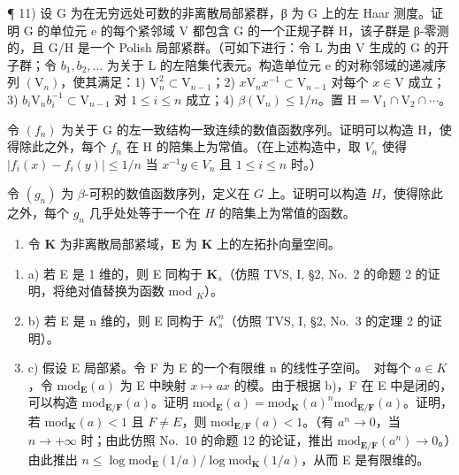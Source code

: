 ¶ 11) 设 G 为在无穷远处可数的非离散局部紧群，β 为 G 上的左 Haar 测度。证明 G 的单位元 e 的每个紧邻域 V 都包含 G 的一个正规子群 H，该子群是 β-零测的，且 G/H 是一个 Polish 局部紧群。（可如下进行：令 L 为由 V 生成的 G 的开子群；令 \(b_{1}, b_{2}, \ldots\) 为关于 L 的左陪集代表元。构造单位元 e 的对称邻域的递减序列 \((\mathrm{V}_{n})\)，使其满足：1) \(\mathrm{V}_{n}^{2} \subset \mathrm{V}_{n-1}\)；2) \(x\mathrm{V}_{n}x^{-1} \subset \mathrm{V}_{n-1}\) 对每个 \(x \in \mathrm{V}\) 成立；3) \(b_{i}\mathrm{V}_{n}b_{i}^{-1} \subset \mathrm{V}_{n-1}\) 对 \(1 \leqslant i \leqslant n\) 成立；4) \(\beta(\mathrm{V}_{n}) \leqslant 1/n\)。置 \(\mathrm{H} = \mathrm{V}_{1} \cap \mathrm{V}_{2} \cap \cdots\)。

令 \((f_{n})\) 为关于 G 的左一致结构一致连续的数值函数序列。证明可以构造 H，使得除此之外，每个 \(f_{n}\) 在 H 的陪集上为常值。（在上述构造中，取 \(V_{n}\) 使得 \(|f_{i}(x) - f_{i}(y)| \leqslant 1/n\) 当 \(x^{-1}y \in V_{n}\) 且 \(1 \leqslant i \leqslant n\) 时。）

令 \((g_n)\) 为 \(\beta\)-可积的数值函数序列，定义在 \(G\) 上。证明可以构造 \(H\)，使得除此之外，每个 \(g_n\) 几乎处处等于一个在 \(H\) 的陪集上为常值的函数。

\begin{enumerate}
\def\labelenumi{\arabic{enumi})}
\setcounter{enumi}{11}
\tightlist
\item
  令 \(\mathbf{K}\) 为非离散局部紧域，\(\mathbf{E}\) 为 \(\mathbf{K}\) 上的左拓扑向量空间。
\end{enumerate}

\begin{enumerate}
\def\labelenumi{\alph{enumi})}
\item
  a) 若 E 是 1 维的，则 E 同构于 \(\mathbf{K}_s\)（仿照 TVS, I, §2, No.~2 的命题 2 的证明，将绝对值替换为函数 mod \(_K\)）。
\item
  b) 若 E 是 n 维的，则 E 同构于 \(K_{s}^{n}\)（仿照 TVS, I, §2, No.~3 的定理 2 的证明）。
\item
  c) 假设 E 局部紧。令 F 为 E 的一个有限维 n 的线性子空间。~对每个 \(a \in K\)，令 \(\text{mod}_{\mathbf{E}}(a)\) 为 E 中映射 \(x \mapsto ax\) 的模。由于根据 b)，F 在 E 中是闭的，可以构造 \(\text{mod}_{\mathbf{E}/\mathbf{F}}(a)\)。证明 \(\text{mod}_{\mathbf{E}}(a) = \text{mod}_{\mathbf{K}}(a)^n \text{mod}_{\mathbf{E}/\mathbf{F}}(a)\)。证明，若 \(\text{mod}_{\mathbf{K}}(a) < 1\) 且 \(F \neq E\)，则 \(\text{mod}_{\mathbf{E}/\mathbf{F}}(a) < 1\)。（有 \(a^n \to 0\)，当 \(n \to +\infty\) 时；由此仿照 No.~10 的命题 12 的论证，推出 \(\text{mod}_{\mathbf{E}/\mathbf{F}}(a^n) \to 0\)。）由此推出 \(n \leqslant \log \text{mod}_{\mathbf{E}}(1/a)/\log \text{mod}_{\mathbf{K}}(1/a)\)，从而 E 是有限维的。
\end{enumerate}

